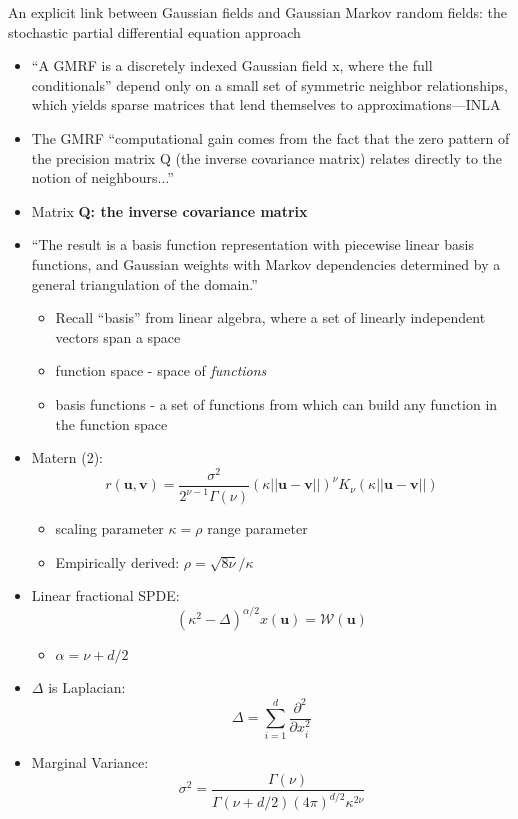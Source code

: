 \documentclass{article}
\begin{document}
An explicit link between Gaussian fields and Gaussian Markov random fields: the stochastic partial differential equation approach \citep{Lindgren2011}
\begin{itemize}
\item ``A GMRF is a discretely indexed Gaussian field x, where the full conditionals'' depend only on a small set of symmetric neighbor relationships, which yields sparse matrices that lend themselves to approximations---INLA
\item The GMRF ``computational gain comes from the fact that the zero pattern of the precision matrix Q (the inverse covariance matrix) relates directly to the notion of neighbours...''
\item Matrix {\bf Q: the inverse covariance matrix}
\item ``The result is a basis function representation with piecewise linear basis functions, and Gaussian weights with Markov dependencies determined by a general triangulation of the domain.'' \citep{Lindgren2011}
  \begin{itemize}
  \item Recall ``basis'' from linear algebra, where a set of linearly independent vectors span a space
  \item function space - space of {\it functions}
  \item basis functions - a set of functions from which can build any function in the function space
  \end{itemize}

\item Matern (2):
$$r(\pmb{u}, \pmb{v}) = \frac{\sigma^{2}}{2^{\nu - 1}\Gamma(\nu)}(\kappa||\pmb{u} - \pmb{v}||)^{\nu}K_{\nu}(\kappa||\pmb{u} - \pmb{v}||)$$
      \begin{itemize}
      \item scaling parameter $\kappa = \rho$ range parameter
      \item Empirically derived: $\rho = \sqrt{8\nu}/\kappa$
      \end{itemize}
\item Linear fractional SPDE:
$$ (\kappa^{2} - \Delta)^{\alpha/2} x(\pmb{u}) = \mathcal{W}(\pmb{u}) $$
      \begin{itemize}
      \item $\alpha = \nu + d/2$
      \end{itemize}
\item $\Delta$ is Laplacian:
$$ \Delta = \sum_{i=1}^{d} \frac{\partial^{2}}{\partial x_{i}^{2}} $$
\item Marginal Variance:
$$\sigma^{2} = \frac{\Gamma(\nu)}{\Gamma(\nu + d/2)(4\pi)^{d/2}\kappa^{2\nu}}$$
\end{itemize}
\end{document}
